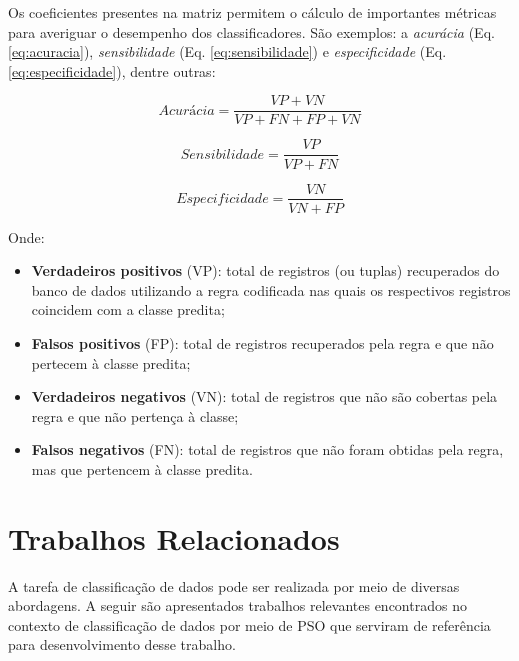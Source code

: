 \documentclass[
	12pt,				%
	openany,			%
	oneside,	
	a4paper,			%
	brazil,				%
	]{unimontes-ppgmsc-abntex2}
\begin{document}
Os coeficientes presentes na matriz permitem o cálculo de importantes métricas para averiguar o desempenho dos classificadores. São exemplos: a {\em acurácia} (Eq. \ref{eq:acuracia}), {\em sensibilidade} (Eq. \ref{eq:sensibilidade}) e {\em especificidade} (Eq. \ref{eq:especificidade}), dentre outras:

\begin{equation}
\label{eq:acuracia}
Acurácia = \frac{VP + VN}{VP + FN + FP + VN}
\end{equation}

\begin{equation}
\label{eq:sensibilidade}
Sensibilidade = \frac{VP}{VP + FN}
\end{equation}

\begin{equation}
\label{eq:especificidade}
Especificidade = \frac{VN}{VN + FP}
\end{equation}

Onde:

\begin{itemize}
\item \textbf{Verdadeiros positivos} (VP): total de registros (ou tuplas) recuperados do banco de dados utilizando a regra codificada nas quais os respectivos registros coincidem com a classe predita; 

\item \textbf{Falsos positivos} (FP): total de registros recuperados pela regra e que não pertecem à classe predita;

\item \textbf{Verdadeiros negativos} (VN): total de registros que não são cobertas pela regra e que não pertença à classe; 

\item \textbf{Falsos negativos} (FN): total de registros que não foram obtidas pela regra, mas que pertencem à classe predita.
\end{itemize}

\section{Trabalhos Relacionados}
\label{sec:trabalhos_relacionados}

A tarefa de classificação de dados pode ser realizada por meio de diversas abordagens. A seguir são apresentados trabalhos relevantes encontrados no contexto de classificação de dados por meio de PSO que serviram de referência para desenvolvimento desse trabalho.
\end{document}
